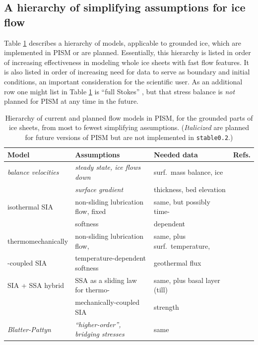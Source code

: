 \documentclass[11pt,final]{amsart}
\begin{document}
\subsection{A hierarchy of simplifying assumptions for ice flow}   Table \ref{tab:modelhierarchy} describes a hierarchy of models, applicable to grounded ice, which are implemented in PISM or are planned.  Essentially, this hierarchy is listed in order of increasing effectiveness in modeling whole ice sheets with fast flow features.  It is also listed in order of increasing need for data to serve as boundary and initial conditions, an important consideration for the scientific user.  As an additional row one might list in Table \ref{tab:modelhierarchy} is ``full Stokes'' \cite{Fowler}, but that stress balance is \emph{not} planned for PISM at any time in the future.

\begin{table}[ht]
\caption{Hierarchy of current and planned flow models in PISM, for the grounded parts of ice sheets, from most to fewest simplifying assumptions.  (\emph{Italicized} are planned for future versions of PISM but are not implemented in \texttt{stable0.2}.)}\label{tab:modelhierarchy} 
\small
\begin{tabular}{|l|l|l|l|}\hline
\textbf{Model} & \textbf{Assumptions} & \textbf{Needed data} & \textbf{Refs.} \\ \hline
\emph{balance velocities} & \emph{steady state, ice flows down} & surf.~mass balance, ice & \cite{JoughinetalGrBal97} \\
 & \quad \emph{surface gradient} & \quad thickness, bed elevation & \\ \hline
isothermal SIA & non-sliding lubrication flow, fixed & same, but possibly time- & \cite{EISMINT96,BLKCB} \\
 & \quad softness & \quad dependent &  \\ \hline
thermomechanically & non-sliding lubrication flow, & same, plus surf.~temperature, & \cite{BBL} \\
\quad -coupled SIA & \quad temperature-dependent softness & \quad geothermal flux &  \\ \hline
SIA + SSA hybrid & SSA as a sliding law for thermo-  & same, plus basal layer (till) & \cite{BBssasliding} \\
  & \quad mechanically-coupled SIA & \quad strength &  \\ \hline
\emph{Blatter-Pattyn} & \emph{``higher-order'', bridging stresses} & same & \cite{Blatter,Pattyn03,SchoofCoulombBlatter} \\ \hline
\end{tabular}
\normalsize
\end{table}
\end{document}
